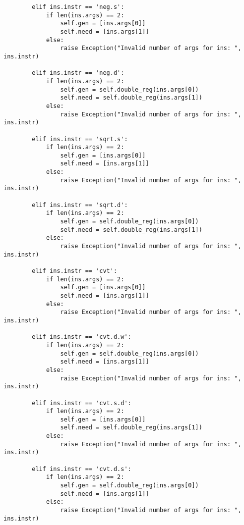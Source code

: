 \begin{lstlisting}
        elif ins.instr == 'neg.s':  
            if len(ins.args) == 2:
                self.gen = [ins.args[0]]
                self.need = [ins.args[1]]
            else:
                raise Exception("Invalid number of args for ins: ", ins.instr)
                                      
        elif ins.instr == 'neg.d':  
            if len(ins.args) == 2:
                self.gen = self.double_reg(ins.args[0])
                self.need = self.double_reg(ins.args[1])
            else:
                raise Exception("Invalid number of args for ins: ", ins.instr)
                                      
        elif ins.instr == 'sqrt.s': 
            if len(ins.args) == 2:
                self.gen = [ins.args[0]]
                self.need = [ins.args[1]]
            else:
                raise Exception("Invalid number of args for ins: ", ins.instr)
                                      
        elif ins.instr == 'sqrt.d': 
            if len(ins.args) == 2:
                self.gen = self.double_reg(ins.args[0])
                self.need = self.double_reg(ins.args[1])
            else:
                raise Exception("Invalid number of args for ins: ", ins.instr)
                                      
        elif ins.instr == 'cvt':    
            if len(ins.args) == 2:
                self.gen = [ins.args[0]]
                self.need = [ins.args[1]]
            else:
                raise Exception("Invalid number of args for ins: ", ins.instr)
                                      
        elif ins.instr == 'cvt.d.w':
            if len(ins.args) == 2:
                self.gen = self.double_reg(ins.args[0])
                self.need = [ins.args[1]]
            else:
                raise Exception("Invalid number of args for ins: ", ins.instr)
                                      
        elif ins.instr == 'cvt.s.d':
            if len(ins.args) == 2:
                self.gen = [ins.args[0]]
                self.need = self.double_reg(ins.args[1])
            else:
                raise Exception("Invalid number of args for ins: ", ins.instr)
                                      
        elif ins.instr == 'cvt.d.s':
            if len(ins.args) == 2:
                self.gen = self.double_reg(ins.args[0])
                self.need = [ins.args[1]]
            else:
                raise Exception("Invalid number of args for ins: ", ins.instr)
                                      

\end{lstlisting}
